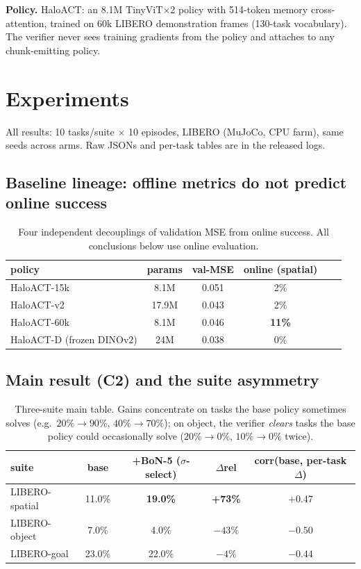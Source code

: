 \documentclass[11pt]{article}
\begin{document}
\textbf{Policy.} HaloACT: an 8.1M TinyViT$\times$2 policy with 514-token memory cross-attention, trained on 60k LIBERO demonstration frames (130-task vocabulary). The verifier never sees training gradients from the policy and attaches to any chunk-emitting policy.

\section{Experiments}
All results: 10 tasks/suite $\times$ 10 episodes, LIBERO (MuJoCo, CPU farm), same seeds across arms. Raw JSONs and per-task tables are in the released logs.

\subsection{Baseline lineage: offline metrics do not predict online success}
\begin{table}[h]
\centering\small
\begin{tabular}{lccccc}
\toprule
policy & params & val-MSE & online (spatial) \\
\midrule
HaloACT-15k & 8.1M & 0.051 & 2\% \\
HaloACT-v2 & 17.9M & 0.043 & 2\% \\
HaloACT-60k & 8.1M & 0.046 & \textbf{11\%} \\
HaloACT-D (frozen DINOv2) & 24M & 0.038 & 0\% \\
\bottomrule
\end{tabular}
\caption{Four independent decouplings of validation MSE from online success. All conclusions below use online evaluation.}
\label{tab:lineage}
\end{table}

\subsection{Main result (C2) and the suite asymmetry}
\begin{table}[h]
\centering\small
\begin{tabular}{lcccc}
\toprule
suite & base & +BoN-5 ($\sigma$-select) & $\Delta$rel & corr(base, per-task $\Delta$) \\
\midrule
LIBERO-spatial & 11.0\% & \textbf{19.0\%} & \textbf{+73\%} & $+0.47$ \\
LIBERO-object & 7.0\% & 4.0\% & $-43\%$ & $-0.50$ \\
LIBERO-goal & 23.0\% & 22.0\% & $-4\%$ & $-0.44$ \\
\bottomrule
\end{tabular}
\caption{Three-suite main table. Gains concentrate on tasks the base policy sometimes solves (e.g.\ $20\%\!\to\!90\%$, $40\%\!\to\!70\%$); on object, the verifier \emph{clears} tasks the base policy could occasionally solve ($20\%\!\to\!0\%$, $10\%\!\to\!0\%$ twice).}
\label{tab:main}
\end{table}
\end{document}
